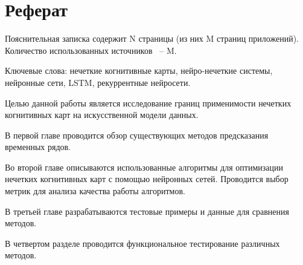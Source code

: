 \chapter*{Реферат}
\thispagestyle{plain}


Пояснительная записка содержит N страницы (из них M страниц приложений). Количество использованных источников ~-- M.

Ключевые слова: нечеткие когнитивные карты, нейро-нечеткие системы, нейронные сети, LSTM, рекуррентные нейросети.

Целью данной работы является исследование границ применимости нечетких когнитивных карт на искусственной модели данных.

В первой главе проводится обзор существующих методов предсказания временных рядов.

Во второй главе описываются использованные алгоритмы для оптимизации нечетких когнитивных карт с помощью нейронных сетей.
Проводится выбор метрик для анализа качества работы алгоритмов.

В третьей главе разрабатываются тестовые примеры и данные для сравнения методов.

В четвертом разделе проводится функциональное тестирование различных методов.

